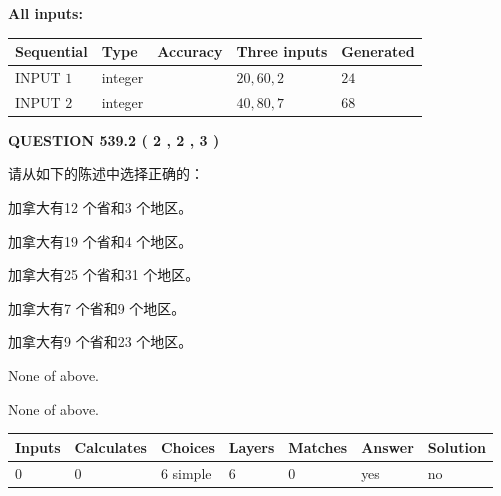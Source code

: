 \documentclass{ctexart}
\begin{document}
   
   
   
\noindent\vspace{0.1in}\hspace{-0.08in} {\textbf{\Large{All inputs: }}}
   
   
  
  
\noindent\begin{tabular}{|l|l|l|l|l|}
\hline
 Sequential & Type & Accuracy & Three inputs & Generated \\ 
\hline
 
 
  INPUT $  1 $ & integer &  & $
 20
 , 
 60
 , 
 2
 $ & $ 24 $ 
 \\  \hline  
 
 
  INPUT $  2 $ & integer &  & $
 40
 , 
 80
 , 
 7
 $ & $ 68 $ 
 \\  \hline  
 \end{tabular}
   
   
  
\vspace{0.2in}
  
{\textbf{\Large{QUESTION
539.2 
 ( 2 , 2 , 3 )
}}}
  
  
请从如下的陈述中选择正确的：
 
 
加拿大有12 个省和3 个地区。
 
 
加拿大有19 个省和4 个地区。
 
 
加拿大有25 个省和31 个地区。
 
 
加拿大有7 个省和9 个地区。
 
 
加拿大有9 个省和23 个地区。
 
 
 None of above.
 
 
\noindent{}
 
 
 None of above.
 
 
\noindent{}
 
 
   
   
   
   
\noindent\begin{tabular}{|l|l|l|l|l|l|l|}
 \hline
Inputs & Calculates & Choices & Layers & Matches & Answer & Solution \\ \hline
 0  & 
 0  & 
 6
  simple  
  & 
 6  & 
 0  & 
  yes & 
  no 
  \\ \hline
 \end{tabular}
   
\end{document}
